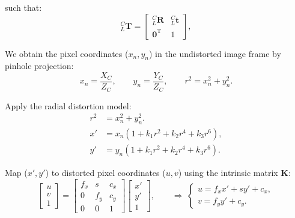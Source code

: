 \documentclass{erauthesis}
\begin{document}
such that:
\begin{equation*}
    _{L}^{C}\mathbf{T} =
    \begin{bmatrix}
        _{L}^{C}\mathbf{R} & _{L}^{C}\mathbf{t} \\
        \mathbf{0}^\mathrm{T} & 1
    \end{bmatrix},
\end{equation*}

We obtain the pixel coordinates ($x_n, y_n$) in the undistorted image frame by pinhole projection:
\begin{equation*}
x_n = \frac{X_C}{Z_C}, \qquad
y_n = \frac{Y_C}{Z_C}, \qquad
r^2 = x_n^2 + y_n^2 .
\label{eq:normalized_coords}
\end{equation*}

Apply the radial distortion model:
\begin{align*}
r^2 & = x_n^2 + y_n^2 .\\
x' & = x_n\!\left(1 + k_1 r^2 + k_2 r^4 + k_3 r^6\right), \\
y' & = y_n\!\left(1 + k_1 r^2 + k_2 r^4 + k_3 r^6\right).
\label{eq:radial_distortion_apply}
\end{align*}

Map ($x', y'$) to distorted pixel coordinates ($u,v$) using the intrinsic matrix $\mathbf{K}$:
\begin{equation}
\begin{bmatrix} u \\ v \\ 1 \end{bmatrix}
=
\begin{bmatrix}
f_x & s & c_x \\
0   & f_y & c_y \\
0   & 0   & 1
\end{bmatrix}
\begin{bmatrix} x' \\ y' \\ 1 \end{bmatrix},
\qquad
\Rightarrow\ 
\begin{cases}
u = f_x x' + s y' + c_x,\\
v = f_y y' + c_y.
\end{cases}
\label{eq:intrinsics_to_pixels}
\end{equation}
\end{document}
